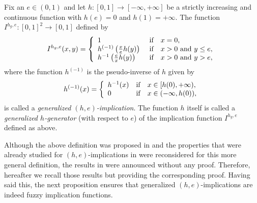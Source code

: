 \begin{definition} Fix an $e \in (0,1)$ and let $h:[0,1] \to [-\infty,+\infty]$ be a strictly increasing and continuous function with $h(e)=0$ and $h(1)= +\infty$. The function $I^{h_g,e}:[0,1]^2 \to [0,1]$ defined by
	$$
	I^{h_g,e}(x,y) = \left\{ \begin{array}{lcl}
		1 &   \hbox{if}  & x=0, \\
		h^{(-1)}\left(\frac{x}{e}h(y)\right)\ &  \hbox{if} & x>0 \text{ and } y\leq e, \\
		h^{-1}\left(\frac{e}{x}h(y)\right) &  \hbox{if}  & x>0 \text{ and } y>e,
	\end{array}
	\right.
	$$
	\noindent where the function $h^{(-1)}$ is the pseudo-inverse of $h$ given by
	$$
	h^{(-1)}(x) = \left\{ \begin{array}{lcl}
		h^{-1}(x) &   \hbox{if}  & x \in [ h(0), + \infty),\\
		0 &  \hbox{if} & x \in (-\infty,h(0)),
	\end{array}
	\right.
	$$
	\noindent is called a \emph{generalized $(h,e)$-implication}. The function $h$ itself is called a \emph{generalized $h$-generator} (with respect to $e$) of the implication function $I^{h_g,e}$ defined as above.
\end{definition}

Although the above definition was proposed in \cite{Hlinena2013} and the properties that were already studied for $(h,e)$-implications in \cite{Massanet2011A} were reconsidered for this more general definition, the results in \cite{Hlinena2013} were announced without any proof. Therefore, hereafter we recall those results but providing the corresponding proof. Having said this, the next proposition ensures that generalized $(h,e)$-implications are indeed fuzzy implication functions.

